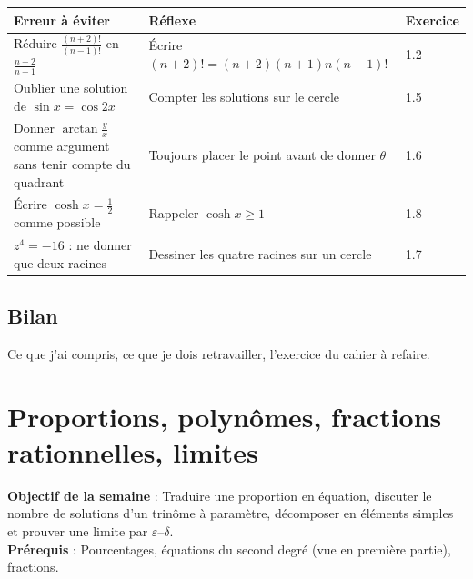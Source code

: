 \documentclass[10.5pt,a4paper]{article}
\newif\ifprof
\newcommand{\synth}{\textsf{\textcolor{ardoise}{(synthèse)}}}
\newcommand{\profonly}[1]{\ifprof #1\fi}
\newcommand{\titrecourant}{Guide de séquence}
\begin{document}
\else
\begin{longtable}{@{}p{7.2cm}p{7.2cm}p{1.6cm}@{}}
\toprule \textbf{Erreur à éviter} & \textbf{Réflexe} & \textbf{Exercice}\\ \midrule\endhead
Réduire $\frac{(n+2)!}{(n-1)!}$ en $\frac{n+2}{n-1}$ & Écrire $(n+2)!=(n+2)(n+1)n(n-1)!$ & 1.2\\
Oublier une solution de $\sin x=\cos2x$ & Compter les solutions sur le cercle & 1.5\\
Donner $\arctan\frac yx$ comme argument sans tenir compte du quadrant & Toujours placer le point avant de donner $\theta$ & 1.6\\
Écrire $\cosh x=\frac12$ comme possible & Rappeler $\cosh x\ge1$ & 1.8\\
$z^4=-16$ : ne donner que deux racines & Dessiner les quatre racines sur un cercle & 1.7\\
\bottomrule\end{longtable}
\fi
\profonly{\subsection{Différenciation et variante FLE/FLS}
Étayage : tableau des valeurs exactes préimprimé. Niveaux : 1.1 (socle), 1.6 (intermédiaire), 1.9 (approfondissement). Extension : racines $n$-ièmes de l'unité (1.9). FLE/FLS : lexique cercle/circle, argument/argument, module/modulus, racine/root.
\subsection{Évaluation}
Contrôle du cahier \S1.6 (20 points, trois questions, barème et corrigé fournis). Barème et corrigé : voir le cahier. Les causes d'erreur ci-dessus sont des hypothèses didactiques, non des constats \synth.}
\subsection{Bilan}
\ifprof À renseigner après la semaine : notions mal acquises, temps réel, réajustements.\else Ce que j'ai compris, ce que je dois retravailler, l'exercice du cahier à refaire.\fi
\clearpage
\section{Proportions, polynômes, fractions rationnelles, limites}
\renewcommand{\titrecourant}{Semaine 2}
\begin{objectif}\textbf{Objectif de la semaine} : Traduire une proportion en équation, discuter le nombre de solutions d'un trinôme à paramètre, décomposer en éléments simples et prouver une limite par $\varepsilon$--$\delta$.\\\textbf{Prérequis} : Pourcentages, équations du second degré (vue en première partie), fractions.\end{objectif}
\end{document}
